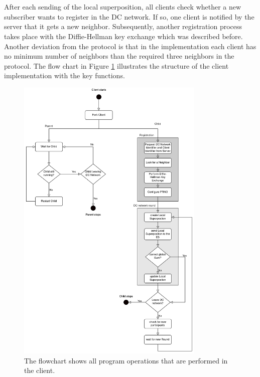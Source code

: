 \\
\\
After each sending of the local superposition, all clients check whether a new subscriber wants to register in the DC network. If so, one client is notified by the server that it gets a new neighbor. Subsequently, another registration process takes place with the Diffie-Hellman key exchange which was described before. Another deviation from the protocol is that in the implementation each client has no minimum number of neighbors than the required three neighbors in the protocol. The flow chart in Figure \ref{fig:Client Implementation} illustrates the structure of the client implementation with the key functions.
\begin{figure}[tbp]
  \centering
  \includegraphics[width=0.8\textwidth]{images/Client_structure2.png}
  \caption[Flowchart Client Implementatioen]{The flowchart shows all program operations that are performed in the client.}
  \label{fig:Client Implementation}
\end{figure}

